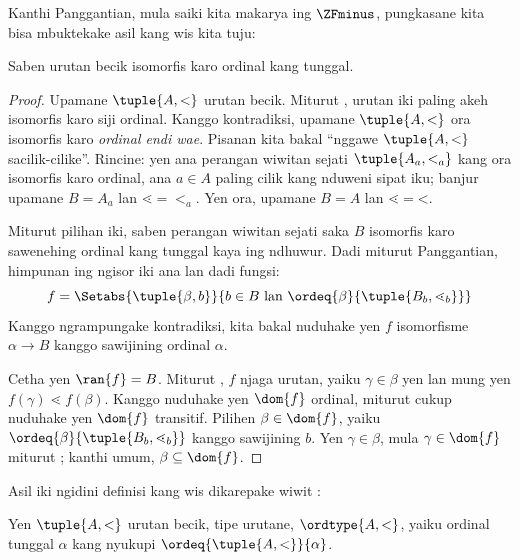 \documentclass[../../../include/open-logic-section]{subfiles}
\begin{document}

Kanthi Panggantian, mula saiki kita makarya ing
$\ZFminus$, pungkasane kita bisa mbuktekake asil
kang wis kita tuju:

\begin{thm}
Saben urutan becik isomorfis karo ordinal kang tunggal.
\end{thm}

\begin{proof}
Upamane $\tuple{A, <}$ urutan becik. Miturut
, urutan iki paling akeh
isomorfis karo siji ordinal. Kanggo kontradiksi,
upamane $\tuple{A, <}$ ora isomorfis karo
\emph{ordinal endi wae}. Pisanan kita bakal
``nggawe $\tuple{A, <}$ sacilik-cilike''.
Rincine: yen ana perangan wiwitan sejati
$\tuple{A_a, <_a}$ kang ora isomorfis karo ordinal,
ana $a \in A$ paling cilik kang nduweni sipat iku;
banjur upamane $B = A_a$ lan
$\mathord{\lessdot} = \mathord{<_a}$.
Yen ora, upamane $B = A$ lan
$\mathord{\lessdot} = \mathord{<}$.

Miturut pilihan iki, saben perangan wiwitan sejati
saka $B$ isomorfis karo sawenehing ordinal kang
tunggal kaya ing ndhuwur. Dadi miturut Panggantian,
himpunan ing ngisor iki ana lan dadi fungsi:
\[
	f = \Setabs{\tuple{\beta, b}}{b \in B\text{ lan }\ordeq{\beta}{\tuple{B_b, \lessdot_b}}}
\]
Kanggo ngrampungake kontradiksi, kita bakal nuduhake
yen $f$ isomorfisme $\alpha \to B$ kanggo sawijining
ordinal $\alpha$.

Cetha yen $\ran{f} = B$. Miturut
, $f$ njaga urutan, yaiku
$\gamma \in \beta$ yen lan mung yen
$f(\gamma) \lessdot f(\beta)$. Kanggo nuduhake yen
$\dom{f}$ ordinal, miturut
 cukup nuduhake
yen $\dom{f}$ transitif. Pilihen
$\beta \in \dom{f}$, yaiku
$\ordeq{\beta}{\tuple{B_b, \lessdot_b}}$ kanggo
sawijining $b$. Yen $\gamma \in \beta$, mula
$\gamma \in \dom{f}$ miturut
; kanthi umum,
$\beta \subseteq \dom{f}$.
\end{proof}

Asil iki ngidini definisi kang wis dikarepake wiwit
:

\begin{defn}
Yen $\tuple{A, <}$ urutan becik, tipe urutane,
$\ordtype{A, <}$, yaiku ordinal tunggal $\alpha$
kang nyukupi $\ordeq{\tuple{A, < }}{\alpha}$.
\end{defn}
\end{document}
